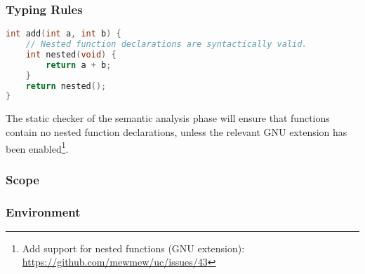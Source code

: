 \subsubsection{Typing Rules}

\begin{lstlisting}[language=C,style=c,caption={\label{fig:nested_func_decl}Nested function declarations.}]
int add(int a, int b) {
	// Nested function declarations are syntactically valid.
	int nested(void) {
		return a + b;
	}
	return nested();
}
\end{lstlisting}

The static checker of the semantic analysis phase will ensure that functions contain no nested function declarations, unless the relevant GNU extension has been enabled\footnote{Add support for nested functions (GNU extension): \url{https://github.com/mewmew/uc/issues/43}}.

\subsubsection{Scope}
\label{sec:scope}


\subsubsection{Environment}
